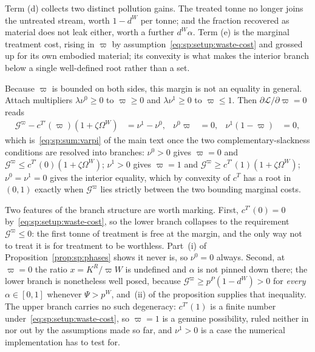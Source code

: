 Term (d) collects two distinct pollution gains. The treated tonne no longer joins the untreated stream, worth $1-d^W$ per tonne; and the fraction recovered as material does not leak either, worth a further $d^W\alpha$. Term (e) is the marginal treatment cost, rising in $\varpi$ by assumption~\eqref{eq:sp:setup:waste-cost} and grossed up for its own embodied material; its convexity is what makes the interior branch below a single well-defined root rather than a set.

 Because $\varpi$ is bounded on both sides, this margin is
not an equality in general. Attach multipliers $\lambda\nu^0\ge0$ to $\varpi\ge0$ and
$\lambda\nu^1\ge0$ to $\varpi\le1$. Then $\partial\mathcal L/\partial\varpi=0$ reads
\begin{align}
\mathcal G^\varpi-c^{T\prime}\left(\varpi\right)\left(1+\zeta\Omega^W\right)
&= \nu^1-\nu^0,
&
\nu^0\varpi &= 0,
&
\nu^1\left(1-\varpi\right) &= 0,
\label{eq:sp:foc:varpi-kkt}
\end{align}
which is~\eqref{eq:sp:sum:varpi} of the main text once the two complementary-slackness conditions are
resolved into branches: $\nu^0>0$ gives $\varpi=0$ and
$\mathcal G^\varpi\le c^{T\prime}\left(0\right)\left(1+\zeta\Omega^W\right)$; $\nu^1>0$ gives
$\varpi=1$ and $\mathcal G^\varpi\ge c^{T\prime}\left(1\right)\left(1+\zeta\Omega^W\right)$;
$\nu^0=\nu^1=0$ gives the interior equality, which by convexity of $c^T$ has a root in
$\left(0,1\right)$ exactly when $\mathcal G^\varpi$ lies strictly between the two bounding marginal
costs.

Two features of the branch structure are worth marking. First,
$c^{T\prime}\left(0\right)=0$ by~\eqref{eq:sp:setup:waste-cost}, so the lower branch collapses to the
requirement $\mathcal G^\varpi\le0$: the first tonne of treatment is free at the margin, and the only
way not to treat it is for treatment to be worthless. Part~(i) of
Proposition~\ref{prop:sp:phases} shows it never is, so $\nu^0=0$ always. Second, at $\varpi=0$ the
ratio $x=K^R/\varpi W$ is undefined and $\alpha$ is not pinned down there; the lower branch is
nonetheless well posed, because $\mathcal G^\varpi\ge p^P\left(1-d^W\right)>0$ for \emph{every}
$\alpha\in\left[0,1\right]$ whenever $\Psi>p^W$, and~(ii) of the proposition supplies that inequality.
The upper branch carries no such degeneracy: $c^{T\prime}\left(1\right)$ is a finite number
under~\eqref{eq:sp:setup:waste-cost}, so $\varpi=1$ is a genuine possibility, ruled neither in nor out
by the assumptions made so far, and $\nu^1>0$ is a case the numerical implementation has to test for.

